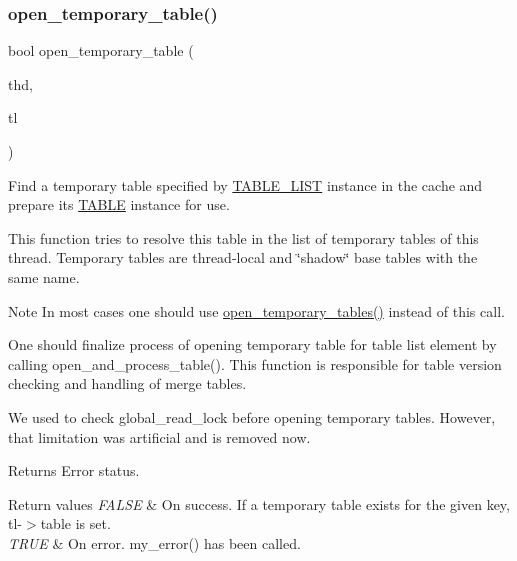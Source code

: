 \subsubsection{\texorpdfstring{open\+\_\+temporary\+\_\+table()}{open\_temporary\_table()}}
{\footnotesize\ttfamily bool open\+\_\+temporary\+\_\+table (\begin{DoxyParamCaption}\item[{T\+HD $\ast$}]{thd,  }\item[{\mbox{\hyperlink{structTABLE__LIST}{T\+A\+B\+L\+E\+\_\+\+L\+I\+ST}} $\ast$}]{tl }\end{DoxyParamCaption})}

Find a temporary table specified by \mbox{\hyperlink{structTABLE__LIST}{T\+A\+B\+L\+E\+\_\+\+L\+I\+ST}} instance in the cache and prepare its \mbox{\hyperlink{structTABLE}{T\+A\+B\+LE}} instance for use.

This function tries to resolve this table in the list of temporary tables of this thread. Temporary tables are thread-\/local and \char`\"{}shadow\char`\"{} base tables with the same name.

\begin{DoxyNote}{Note}
In most cases one should use \mbox{\hyperlink{group__Data__Dictionary_gac4c1cb71807d09d53273048447abf301}{open\+\_\+temporary\+\_\+tables()}} instead of this call.

One should finalize process of opening temporary table for table list element by calling open\+\_\+and\+\_\+process\+\_\+table(). This function is responsible for table version checking and handling of merge tables.

We used to check global\+\_\+read\+\_\+lock before opening temporary tables. However, that limitation was artificial and is removed now.
\end{DoxyNote}
\begin{DoxyReturn}{Returns}
Error status. 
\end{DoxyReturn}

\begin{DoxyRetVals}{Return values}
{\em F\+A\+L\+SE} & On success. If a temporary table exists for the given key, tl-\/$>$table is set. \\
\hline
{\em T\+R\+UE} & On error. my\+\_\+error() has been called. \\
\hline
\end{DoxyRetVals}
\mbox{\label{group__Data__Dictionary_gac4c1cb71807d09d53273048447abf301}} 
